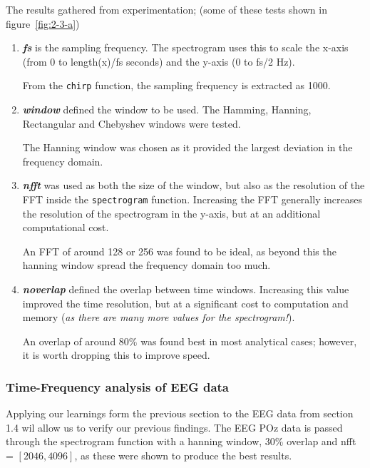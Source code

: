\documentclass[main.tex]{subfiles}
\begin{document}
The results gathered from experimentation; (some of these tests shown in figure~\ref{fig:2-3-a})

\begin{enumerate}
	\item \textbf{\textit{fs}} is the sampling frequency. The spectrogram uses this to scale the x-axis (from 0 to length(x)/fs seconds) and the y-axis (0 to fs/2 Hz). 
	
	From the {\tt chirp} function, the sampling frequency is extracted as 1000. 
	
	\item \textbf{\textit{window}} defined the window to be used. The Hamming, Hanning, Rectangular and Chebyshev windows were tested.
	
	The Hanning window was chosen as it provided the largest deviation in the frequency domain. 
	
	\item \textbf{\textit{nfft}} was used as both the size of the window, but also as the resolution of the FFT inside the {\tt spectrogram} function. Increasing the FFT generally increases the resolution of the spectrogram in the y-axis, but at an additional computational cost.
	
	An FFT of around 128 or 256 was found to be ideal, as beyond this the hanning window spread the frequency domain too much.
	
	\item \textbf{\textit{noverlap}} defined the overlap between time windows. Increasing this value improved the time resolution, but at a significant cost to computation and memory (\textit{as there are many more values for the spectrogram!}).
	
	An overlap of around $80\%$ was found best in most analytical cases; however, it is worth dropping this to improve speed.
\end{enumerate}

\subsubsection{Time-Frequency analysis of EEG data}

Applying our learnings form the previous section to the EEG data from section 1.4 wil allow us to verify our previous findings. The EEG POz data is passed through the spectrogram function with a hanning window, 30\% overlap and nfft = $[2046, 4096]$, as these were shown to produce the best results.
\end{document}
